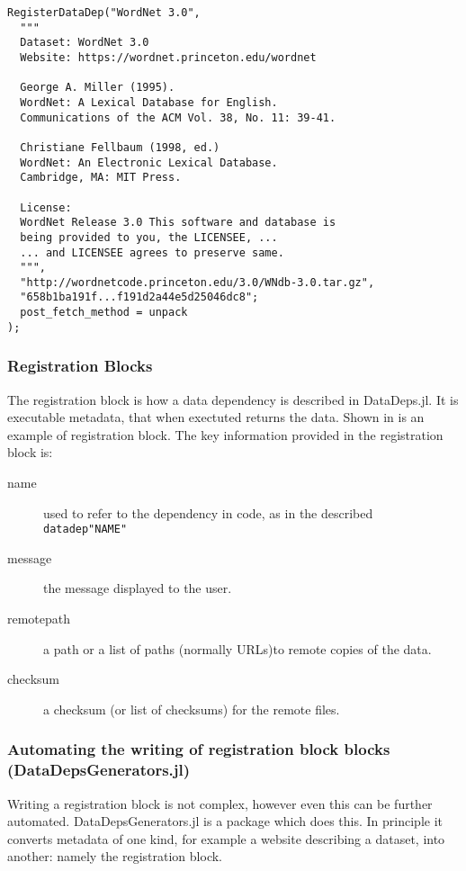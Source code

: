 \documentclass{jors}
\newcommand{\datadep}[1]{\texttt{datadep"{}#1"{}}}
\begin{document}
\begin{lstlisting}[frame=single, caption={Example registration block for WordNet. The majority of it is a message for the user.}, label={lst:regblock}] 
  RegisterDataDep("WordNet 3.0",
  """
  Dataset: WordNet 3.0
  Website: https://wordnet.princeton.edu/wordnet

  George A. Miller (1995). 
  WordNet: A Lexical Database for English.
  Communications of the ACM Vol. 38, No. 11: 39-41.

  Christiane Fellbaum (1998, ed.) 
  WordNet: An Electronic Lexical Database. 
  Cambridge, MA: MIT Press.

  License: 
  WordNet Release 3.0 This software and database is 
  being provided to you, the LICENSEE, ... 
  ... and LICENSEE agrees to preserve same.
  """,
  "http://wordnetcode.princeton.edu/3.0/WNdb-3.0.tar.gz",
  "658b1ba191f...f191d2a44e5d25046dc8";
  post_fetch_method = unpack
);
\end{lstlisting}

\subsubsection{Registration Blocks}
The registration block is how a data dependency is described in DataDeps.jl.
It is executable metadata, that when exectuted returns the data.
Shown in  is an example of registration block.
The key information provided in the registration block is:
\begin{description}
\item[name] used to refer to the dependency in code, as in the described \datadep{NAME}
\item[message] the message displayed to the user.
\item[remotepath] a path or a list of paths (normally URLs)to remote copies of the data.
\item[checksum] a checksum (or list of checksums) for the remote files.
\end{description}




\subsubsection{Automating the writing of registration block blocks (DataDepsGenerators.jl)}
Writing a registration block is not complex, however even this can be further automated.
DataDepsGenerators.jl is a package which does this.
In principle it converts metadata of one kind, for example a website describing a dataset,
into another: namely the registration block.
\end{document}
